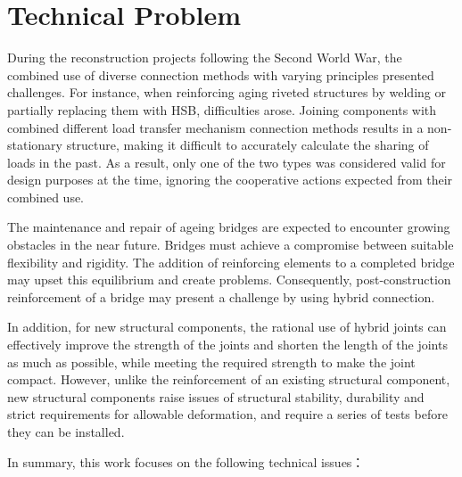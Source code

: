 \section{Technical Problem}

During the reconstruction projects following the Second World War, the combined use of diverse connection methods with varying principles presented challenges. For instance, when reinforcing aging riveted structures by welding or partially replacing them with \ac{HSB}, difficulties arose. Joining components with combined different load transfer mechanism connection methods results in a non-stationary structure, making it difficult to accurately calculate the sharing of loads in the past. As a result, only one of the two types was considered valid for design purposes at the time, ignoring the cooperative actions expected from their combined use.

The maintenance and repair of ageing bridges are expected to encounter growing obstacles in the near future. Bridges must achieve a compromise between suitable flexibility and rigidity. The addition of reinforcing elements to a completed bridge may upset this equilibrium and create problems. Consequently, post-construction reinforcement of a bridge may present a challenge by using hybrid connection.

In addition, for new structural components, the rational use of hybrid joints can effectively improve the strength of the joints and shorten the length of the joints as much as possible, while meeting the required strength to make the joint compact.  However, unlike the reinforcement of an existing structural component, new structural components raise issues of structural stability, durability and strict requirements for allowable deformation, and require a series of tests before they can be installed.

In summary, this work focuses on the following technical issues：

